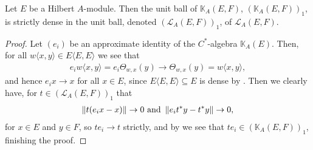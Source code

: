 \begin{proposition}
	Let $E$ be a Hilbert $A$-module. Then the unit ball of $\mathbb{K}_A(E,F)$, $(\mathbb{K}_A(E,F))_1$, is strictly dense in the unit ball, denoted $(\mathcal{L}_A(E,F))_1$, of $\mathcal{L}_A(E,F)$.
	\label{mult:unitstrictdense}
\end{proposition}
\begin{proof}
	Let $(e_i)$ be an approximate identity of the $C^*$-algebra $\mathbb{K}_A(E)$. Then, for all $w\langle x,y \rangle \in E\langle E,E \rangle$ we see that
	\begin{align*}
		e_i w\langle x,y \rangle = e_i \Theta_{w,x}(y) \to \Theta_{w,x}(y) = w \langle x,y\rangle,
	\end{align*}
	and hence $e_i x \to x$ for all $x \in E$, since $E\langle E,E\rangle \subseteq E$ is dense by . Then we clearly have, for $t \in (\mathcal{L}_A(E,F))_1$ that
	\begin{align*}
		\left\lVert t(e_ix-x)\right\rVert \to 0 \text{  and  } \left\lVert e_it^*y-t^*y\right\rVert \to 0,
	\end{align*}
	for $x \in E$ and $y \in F$, so $te_i \to t$ strictly, and by  we see that $te_i \in (\mathbb{K}_A(E,F))_1$, finishing the proof.
\end{proof}


